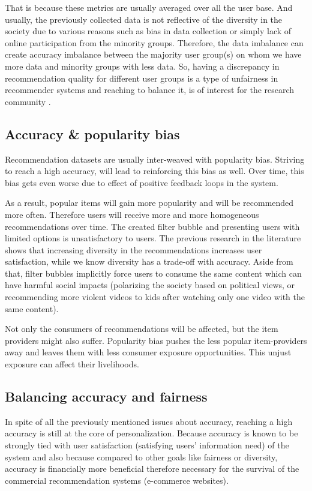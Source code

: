 That is because these metrics are usually averaged over all the user base. And usually, the previously collected data is not reflective of the diversity in the society due to various reasons such as bias in data collection or simply lack of online participation from the minority groups. Therefore, the data imbalance can create accuracy imbalance between the majority user group(s) on whom we have more data and minority groups with less data. So, having a discrepancy in recommendation quality for different user groups is a type of unfairness  in recommender systems and reaching to balance it, is of interest for the research community .


\subsection{Accuracy \& popularity bias}
Recommendation datasets are usually inter-weaved with popularity bias. Striving to reach a high accuracy, will lead to reinforcing this bias as well. Over time, this bias gets even worse due to effect of positive feedback loops in the system.

As a result, popular items will gain more popularity and will be recommended more often. 
Therefore users will receive more and more homogeneous recommendations over time. The created filter bubble and presenting users with limited options is unsatisfactory to users. The previous research in the literature shows that increasing diversity in the recommendations increases user satisfaction, while we know diversity has a trade-off with accuracy. Aside from that, filter bubbles implicitly force users to consume the same content which can have harmful social impacts (polarizing the society based on political views, or recommending more violent videos to kids after watching only one video with the same content). 

Not only the consumers of recommendations will be affected, but the item providers might also suffer. Popularity bias pushes the less popular item-providers away and leaves them with less consumer exposure opportunities. This unjust exposure can affect their livelihoods.


\subsection{Balancing accuracy and fairness}

In spite of all the previously mentioned issues about accuracy, reaching a high accuracy is still at the core of personalization. Because accuracy is known to be strongly tied with user satisfaction (satisfying users' information need) of the system and also because compared to other goals like fairness or diversity, accuracy is financially more beneficial therefore necessary for the survival of the commercial recommendation systems (e-commerce websites).

